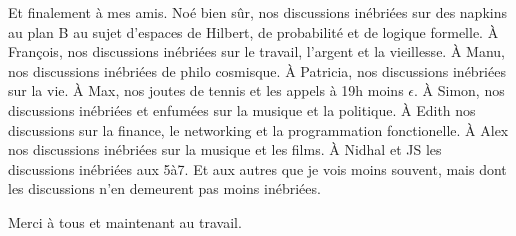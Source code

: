 Et finalement à mes amis. Noé bien sûr, nos discussions inébriées sur des napkins au plan
B au sujet d'espaces de Hilbert, de probabilité et de logique formelle. À François, nos
discussions inébriées sur le travail, l'argent et la vieillesse. À Manu, nos discussions
inébriées de philo cosmisque. À Patricia, nos discussions inébriées sur la vie. À Max, nos
joutes de tennis et les appels à 19h moins $\epsilon$. À Simon, nos discussions inébriées et
enfumées sur la musique et la politique. À Edith nos discussions sur la finance, le
networking et la programmation fonctionelle. À Alex nos discussions inébriées sur la
musique et les films. À Nidhal et JS les discussions inébriées aux 5à7. Et aux autres que
je vois moins souvent, mais dont les discussions n'en demeurent pas moins inébriées.

Merci à tous et maintenant au travail. 

